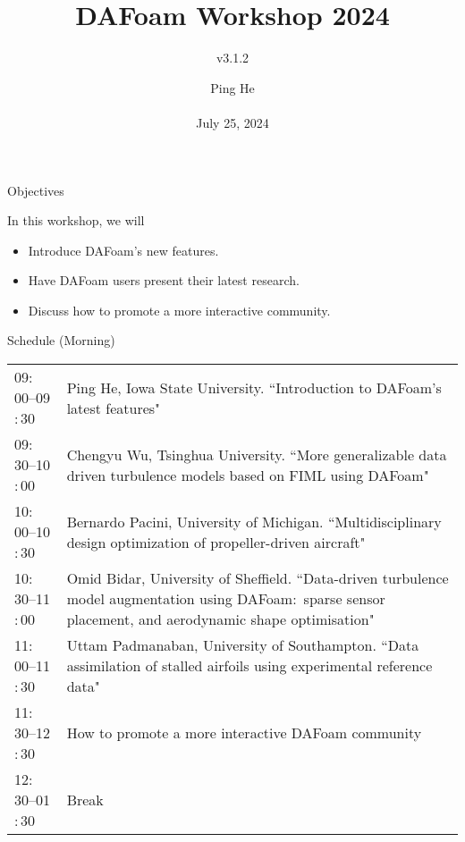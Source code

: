 \documentclass{bredelebeamer}
\title[ ]{DAFoam Workshop 2024}
\subtitle{v3.1.2}
\author{Ping He\\ ~ \\July 25, 2024 }
\date[July 25, 2024]{}
\begin{document}
\begin{frame}
  \titlepage
\end{frame}



\begin{frame}{Objectives}

In this workshop, we will
\begin{itemize}
  \setlength\itemsep{1em}
 \item Introduce DAFoam's new features.
 \item Have DAFoam users present their latest research.
 \item Discuss how to promote a more interactive community.
\end{itemize}

\end{frame}

\begin{frame}{Schedule (Morning)}
\small
\begin{tabularx}{\textwidth}{lX}
 09$:$00--09$:$30 & Ping He, Iowa State University. ``Introduction to DAFoam's latest features" \\ 
 09$:$30--10$:$00 & Chengyu Wu, Tsinghua University. ``More generalizable data driven turbulence models based on FIML using DAFoam" \\  
 10$:$00--10$:$30 & Bernardo Pacini, University of Michigan. ``Multidisciplinary design optimization of propeller-driven aircraft" \\ 
 10$:$30--11$:$00 & Omid Bidar, University of Sheffield. ``Data-driven turbulence model augmentation using DAFoam$:$ sparse sensor placement, and aerodynamic shape optimisation" \\  
  11$:$00--11$:$30 & Uttam Padmanaban, University of Southampton. ``Data assimilation of stalled airfoils using experimental reference data" \\  
  11$:$30--12$:$30 & How to promote a more interactive DAFoam community \\
  12$:$30--01$:$30 & Break
\end{tabularx}

\end{frame}
\end{document}
